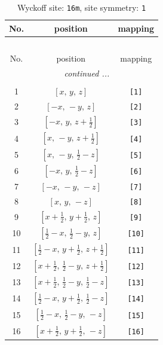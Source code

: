 \documentclass[fleqn,8pt]{jsarticle}
\begin{document}
\begin{longtable}{ccc}
\caption{Wyckoff site: {\tt 16m}, site symmetry: {\tt 1}}
 \\
 \hline \hline
No. & position & mapping \\ \hline \endfirsthead

\multicolumn{2}{l}{\tablename\ \thetable{}} \\
 \hline \hline
No. & position & mapping \\ \hline \endhead

 \hline \hline
\multicolumn{2}{r}{\footnotesize\it continued ...} \\ \endfoot

 \hline \hline
\multicolumn{2}{r}{} \\ \endlastfoot

1 & $\left[ x,\, y,\, z \right]$ & {\tt [1]} \\ \hline
2 & $\left[ - x,\, - y,\, z \right]$ & {\tt [2]} \\ \hline
3 & $\left[ - x,\, y,\, z + \frac{1}{2} \right]$ & {\tt [3]} \\ \hline
4 & $\left[ x,\, - y,\, z + \frac{1}{2} \right]$ & {\tt [4]} \\ \hline
5 & $\left[ x,\, - y,\, \frac{1}{2} - z \right]$ & {\tt [5]} \\ \hline
6 & $\left[ - x,\, y,\, \frac{1}{2} - z \right]$ & {\tt [6]} \\ \hline
7 & $\left[ - x,\, - y,\, - z \right]$ & {\tt [7]} \\ \hline
8 & $\left[ x,\, y,\, - z \right]$ & {\tt [8]} \\ \hline
9 & $\left[ x + \frac{1}{2},\, y + \frac{1}{2},\, z \right]$ & {\tt [9]} \\ \hline
10 & $\left[ \frac{1}{2} - x,\, \frac{1}{2} - y,\, z \right]$ & {\tt [10]} \\ \hline
11 & $\left[ \frac{1}{2} - x,\, y + \frac{1}{2},\, z + \frac{1}{2} \right]$ & {\tt [11]} \\ \hline
12 & $\left[ x + \frac{1}{2},\, \frac{1}{2} - y,\, z + \frac{1}{2} \right]$ & {\tt [12]} \\ \hline
13 & $\left[ x + \frac{1}{2},\, \frac{1}{2} - y,\, \frac{1}{2} - z \right]$ & {\tt [13]} \\ \hline
14 & $\left[ \frac{1}{2} - x,\, y + \frac{1}{2},\, \frac{1}{2} - z \right]$ & {\tt [14]} \\ \hline
15 & $\left[ \frac{1}{2} - x,\, \frac{1}{2} - y,\, - z \right]$ & {\tt [15]} \\ \hline
16 & $\left[ x + \frac{1}{2},\, y + \frac{1}{2},\, - z \right]$ & {\tt [16]} \\
\end{longtable}
\end{document}
